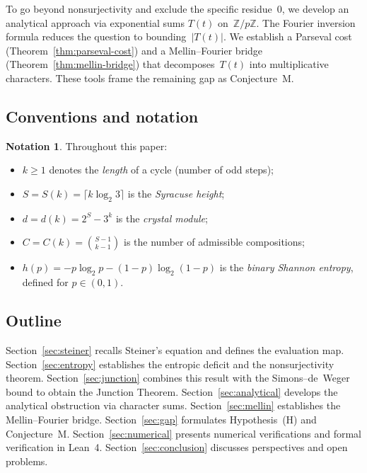 \documentclass[12pt, a4paper]{amsart}
\theoremstyle{plain}
\theoremstyle{definition}
\newtheorem{notation}[theorem]{Notation}
\theoremstyle{remark}
\newcommand{\Z}{\mathbb{Z}}
\begin{document}
To go beyond nonsurjectivity and exclude the specific
residue~$0$, we develop an analytical approach via
exponential sums $T(t)$ on~$\Z/p\Z$.
The Fourier inversion formula reduces the question to
bounding~$|T(t)|$.
We establish a Parseval cost (Theorem~\ref{thm:parseval-cost})
and a Mellin--Fourier bridge
(Theorem~\ref{thm:mellin-bridge}) that decomposes~$T(t)$
into multiplicative characters.
These tools frame the remaining gap as Conjecture~M.

\subsection{Conventions and notation}\label{ssec:notations}

\begin{notation}\label{not:main}
  Throughout this paper:
  \begin{itemize}
    \item $k \geq 1$ denotes the \emph{length} of a cycle
      (number of odd steps);
    \item $S = S(k) = \lceil k \log_2 3 \rceil$ is the
      \emph{Syracuse height};
    \item $d = d(k) = 2^S - 3^k$ is the \emph{crystal module};
    \item $C = C(k) = \binom{S-1}{k-1}$ is the number of
      admissible compositions;
    \item $h(p) = -p\log_2 p - (1-p)\log_2(1-p)$ is the
      \emph{binary Shannon entropy}, defined for
      $p \in (0,1)$.
  \end{itemize}
\end{notation}

\subsection{Outline}

Section~\ref{sec:steiner} recalls Steiner's equation and
defines the evaluation map.
Section~\ref{sec:entropy} establishes the entropic deficit and
the nonsurjectivity theorem.
Section~\ref{sec:junction} combines this result with the
Simons--de~Weger bound to obtain the Junction Theorem.
Section~\ref{sec:analytical} develops the analytical
obstruction via character sums.
Section~\ref{sec:mellin} establishes the Mellin--Fourier bridge.
Section~\ref{sec:gap} formulates Hypothesis~(H) and
Conjecture~M.
Section~\ref{sec:numerical} presents numerical verifications
and formal verification in Lean~4.
Section~\ref{sec:conclusion} discusses perspectives and
open problems.
\end{document}

